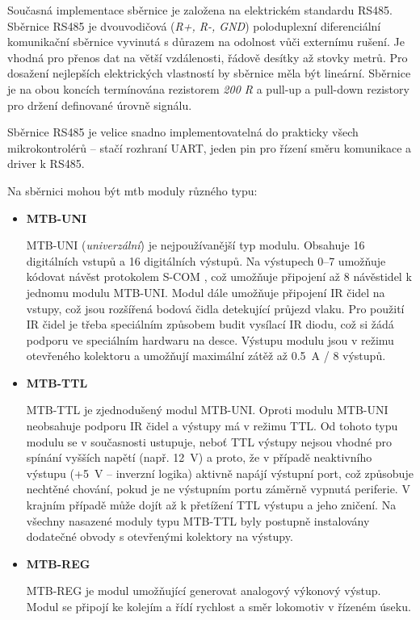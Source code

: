 Současná implementace sběrnice je založena na elektrickém standardu RS485.
Sběrnice RS485 je dvouvodičová (\textit{R+, R-, GND}) poloduplexní
diferenciální komunikační sběrnice vyvinutá s důrazem na odolnost vůči
externímu rušení. Je vhodná pro přenos dat na větší vzdálenosti, řádově desítky
až stovky metrů. Pro dosažení nejlepších elektrických vlastností by sběrnice
měla být lineární. Sběrnice je na obou koncích termínována rezistorem
\textit{200 R} a pull-up a pull-down rezistory pro držení definované úrovně
signálu.

Sběrnice RS485 je velice snadno implementovatelná do prakticky všech
mikrokontrolérů – stačí rozhraní UART, jeden pin pro řízení směru komunikace
a driver k RS485.

Na sběrnici mohou být \gls{mtb} moduly různého typu:

\begin{itemize}
\item \textbf{MTB-UNI}

	MTB-UNI (\textit{univerzální}) je nejpoužívanější typ modulu. Obsahuje 16
	digitálních vstupů a 16 digitálních výstupů. Na výstupech 0–7 umožňuje kódovat
	návěst protokolem S-COM \cite{}, což umožňuje připojení až 8 návěstidel
	k jednomu modulu MTB-UNI. Modul dále umožňuje připojení IR čidel na vstupy,
	což jsou rozšířená bodová čidla detekující průjezd vlaku. Pro použití IR
	čidel je třeba speciálním způsobem budit vysílací IR diodu, což si žádá podporu
	ve speciálním hardwaru na desce. Výstupu modulu jsou v režimu otevřeného
	kolektoru a umožňují maximální zátěž až 0.5~A / 8 výstupů.

\item \textbf{MTB-TTL}

	MTB-TTL je zjednodušený modul MTB-UNI. Oproti modulu MTB-UNI neobsahuje
	podporu IR čidel a výstupy má v režimu TTL. Od tohoto typu modulu se v
	současnosti ustupuje, neboť TTL výstupy nejsou vhodné pro spínání vyšších
	napětí (např. 12~V) a proto, že v případě neaktivního výstupu (+5~V –
	inverzní logika) aktivně napájí výstupní port, což způsobuje nechtěné chování,
	pokud je ne výstupním portu záměrně vypnutá periferie. V krajním případě může
	dojít až k přetížení TTL výstupu a jeho zničení. Na všechny nasazené moduly
	typu MTB-TTL byly postupně instalovány dodatečné obvody s otevřenými
	kolektory na výstupy.

\item \textbf{MTB-REG}

	MTB-REG je modul umožňující generovat analogový výkonový výstup. Modul se
	připojí ke kolejím a řídí rychlost a směr lokomotiv v řízeném úseku.


\end{itemize}
